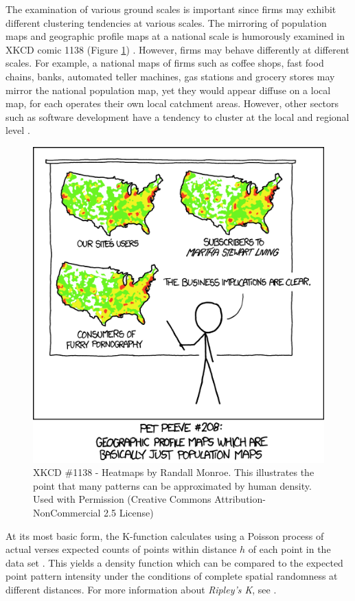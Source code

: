 
The examination of various ground scales is important since firms may exhibit different clustering tendencies at various scales.  The mirroring of population maps and geographic profile maps at a national scale is humorously examined in XKCD comic 1138 (Figure \ref{fig:heatmapxkcd}) \citep{XKCD1138}.  However, firms may behave differently at different scales.  For example, a national maps of firms such as coffee shops, fast food chains, banks, automated teller machines, gas stations and grocery stores may mirror the national population map, yet they would appear diffuse on a local map, for each operates their own local catchment areas.  However, other sectors such as software development have a tendency to cluster at the local and regional level \citep{Meyer2006}.  

\begin{figure}
	\centering
	\includegraphics[width=0.5\linewidth]{Figures/ChapterIII/heatmap_XKCD}
	\caption[XKCD 1138 - Heatmaps]{XKCD \#1138 - Heatmaps by Randall Monroe. This illustrates the point that many patterns can be approximated by human density. Used with Permission (Creative Commons Attribution-NonCommercial 2.5 License)}
	\label{fig:heatmapxkcd}
\end{figure}

At its most basic form, the K-function calculates using a Poisson process of actual verses expected counts of points within distance $h$ of each point in the data set \citep{dixon2014r}.  This yields a density function which can be compared to the expected point pattern intensity under the conditions of complete spatial randomness at different distances.  For more information about\textit{ Ripley's K}, see \cite{ripley1976second,fischer2009handbook,spatstatBook}.


